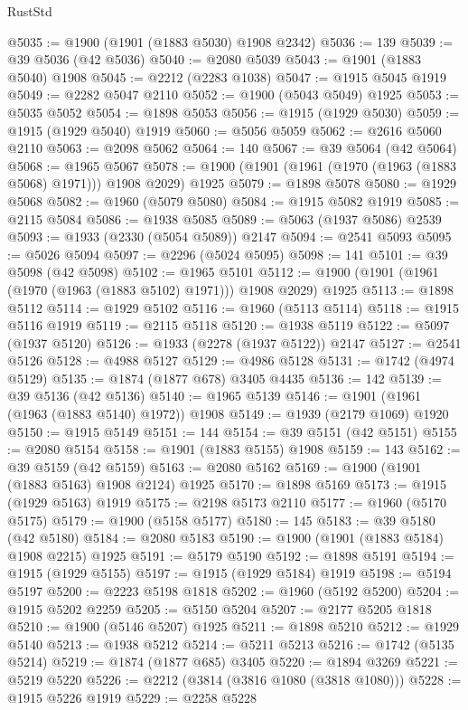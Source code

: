 \begin{lexlean}{RustStd}
\begin{coremodule}
{\begin{coremodule}
{{{{{{{{{{{{{{{{{{{{{{{{{{{{{{{{{{{{{{{{{{{@5035 := @1900 (@1901 (@1883 @5030) @1908 @2342)
@5036 := 139
@5039 := @39 @5036 (@42 @5036)
@5040 := @2080 @5039
@5043 := @1901 (@1883 @5040) @1908
@5045 := @2212 (@2283 @1038)
@5047 := @1915 @5045 @1919
@5049 := @2282 @5047 @2110
@5052 := @1900 (@5043 @5049) @1925
@5053 := @5035 @5052
@5054 := @1898 @5053
@5056 := @1915 (@1929 @5030)
@5059 := @1915 (@1929 @5040) @1919
@5060 := @5056 @5059
@5062 := @2616 @5060 @2110
@5063 := @2098 @5062
@5064 := 140
@5067 := @39 @5064 (@42 @5064)
@5068 := @1965 @5067
@5078 := @1900 (@1901 (@1961 (@1970 (@1963 (@1883 @5068) @1971))) @1908 @2029) @1925
@5079 := @1898 @5078
@5080 := @1929 @5068
@5082 := @1960 (@5079 @5080)
@5084 := @1915 @5082 @1919
@5085 := @2115 @5084
@5086 := @1938 @5085
@5089 := @5063 (@1937 @5086) @2539
@5093 := @1933 (@2330 (@5054 @5089)) @2147
@5094 := @2541 @5093
@5095 := @5026 @5094
@5097 := @2296 (@5024 @5095)
@5098 := 141
@5101 := @39 @5098 (@42 @5098)
@5102 := @1965 @5101
@5112 := @1900 (@1901 (@1961 (@1970 (@1963 (@1883 @5102) @1971))) @1908 @2029) @1925
@5113 := @1898 @5112
@5114 := @1929 @5102
@5116 := @1960 (@5113 @5114)
@5118 := @1915 @5116 @1919
@5119 := @2115 @5118
@5120 := @1938 @5119
@5122 := @5097 (@1937 @5120)
@5126 := @1933 (@2278 (@1937 @5122)) @2147
@5127 := @2541 @5126
@5128 := @4988 @5127
@5129 := @4986 @5128
@5131 := @1742 (@4974 @5129)
@5135 := @1874 (@1877 @678) @3405 @4435
@5136 := 142
@5139 := @39 @5136 (@42 @5136)
@5140 := @1965 @5139
@5146 := @1901 (@1961 (@1963 (@1883 @5140) @1972)) @1908
@5149 := @1939 (@2179 @1069) @1920
@5150 := @1915 @5149
@5151 := 144
@5154 := @39 @5151 (@42 @5151)
@5155 := @2080 @5154
@5158 := @1901 (@1883 @5155) @1908
@5159 := 143
@5162 := @39 @5159 (@42 @5159)
@5163 := @2080 @5162
@5169 := @1900 (@1901 (@1883 @5163) @1908 @2124) @1925
@5170 := @1898 @5169
@5173 := @1915 (@1929 @5163) @1919
@5175 := @2198 @5173 @2110
@5177 := @1960 (@5170 @5175)
@5179 := @1900 (@5158 @5177)
@5180 := 145
@5183 := @39 @5180 (@42 @5180)
@5184 := @2080 @5183
@5190 := @1900 (@1901 (@1883 @5184) @1908 @2215) @1925
@5191 := @5179 @5190
@5192 := @1898 @5191
@5194 := @1915 (@1929 @5155)
@5197 := @1915 (@1929 @5184) @1919
@5198 := @5194 @5197
@5200 := @2223 @5198 @1818
@5202 := @1960 (@5192 @5200)
@5204 := @1915 @5202 @2259
@5205 := @5150 @5204
@5207 := @2177 @5205 @1818
@5210 := @1900 (@5146 @5207) @1925
@5211 := @1898 @5210
@5212 := @1929 @5140
@5213 := @1938 @5212
@5214 := @5211 @5213
@5216 := @1742 (@5135 @5214)
@5219 := @1874 (@1877 @685) @3405
@5220 := @1894 @3269
@5221 := @5219 @5220
@5226 := @2212 (@3814 (@3816 @1080 (@3818 @1080)))
@5228 := @1915 @5226 @1919
@5229 := @2258 @5228
}}}}}}}}}}}}}}}}}}}}}}}}}}}}}}}}}}}}}}}}}}}
\end{coremodule}}
\end{coremodule}
\end{lexlean}
